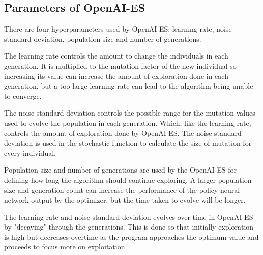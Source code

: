 \documentclass{article}
\begin{document}
\subsection*{Parameters of OpenAI-ES}
\noindent There are four hyperparameters used by OpenAI-ES: learning rate, noise standard deviation, population size and number of generations. \par
\noindent The learning rate controls the amount to change the individuals in each generation. It is multiplied to the mutation factor of the new individual so increasing its value can increase the amount of exploration done in each generation, but a too large learning rate can lead to the algorithm being unable to converge. \par
\noindent The noise standard deviation controls the possible range for the mutation values used to evolve the population in each generation. Which, like the learning rate, controls the amount of exploration done by OpenAI-ES. The noise standard deviation is used in the stochastic function to calculate the size of mutation for every individual. \par
\noindent Population size and number of generations are used by the OpenAI-ES for defining how long the algorithm should continue exploring. A larger population size and generation count can increase the performance of the policy neural network output by the optimizer, but the time taken to evolve will be longer. \par
\noindent The learning rate and noise standard deviation evolves over time in OpenAI-ES by "decaying" through the generations. This is done so that initially exploration is high but decreases overtime as the program approaches the optimum value and proceeds to focus more on exploitation. \par
\end{document}
